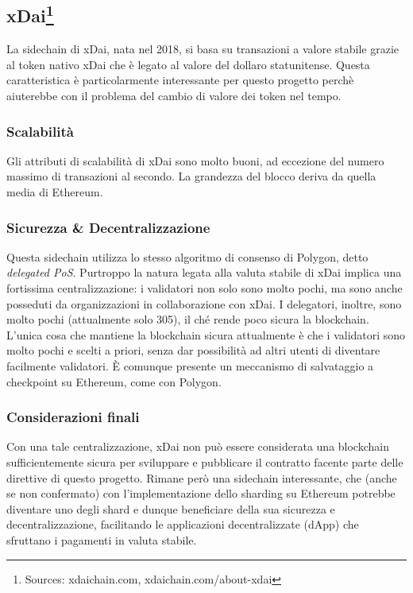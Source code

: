 \documentclass[a4paper, 12pt]{article}
\begin{document}
\newpage
\subsection*{xDai\footnote{Sources: xdaichain.com, xdaichain.com/about-xdai}}
La sidechain di xDai, nata nel 2018, si basa su transazioni a valore stabile grazie al token nativo xDai che è legato al valore del dollaro statunitense.
Questa caratteristica è particolarmente interessante per questo progetto perchè aiuterebbe con il problema del cambio di valore dei token nel tempo.

\subsubsection*{Scalabilità}
Gli attributi di scalabilità di xDai sono molto buoni, ad eccezione del numero massimo di transazioni al secondo.
La grandezza del blocco deriva da quella media di Ethereum.

\subsubsection*{Sicurezza \& Decentralizzazione}
Questa sidechain utilizza lo stesso algoritmo di consenso di Polygon, detto \textit{delegated PoS}.
Purtroppo la natura legata alla valuta stabile di xDai implica una fortissima centralizzazione: i validatori non solo sono molto pochi, ma sono anche posseduti da organizzazioni
in collaborazione con xDai. I delegatori, inoltre, sono molto pochi (attualmente solo 305), il ché rende poco sicura la blockchain.
L'unica cosa che mantiene la blockchain sicura attualmente è che i validatori sono molto pochi e scelti a priori, senza dar possibilità ad altri utenti di diventare facilmente validatori.
È comunque presente un meccanismo di salvataggio a checkpoint su Ethereum, come con Polygon.

\subsubsection*{Considerazioni finali}
Con una tale centralizzazione, xDai non può essere considerata una blockchain sufficientemente sicura per sviluppare e pubblicare il contratto facente parte delle direttive di questo progetto. Rimane però una sidechain interessante, che (anche se non confermato) con l'implementazione dello sharding su Ethereum potrebbe diventare uno degli shard e dunque beneficiare della sua sicurezza e decentralizzazione, facilitando le applicazioni decentralizzate (dApp) che sfruttano i pagamenti in valuta stabile.
\end{document}
